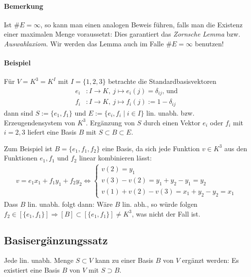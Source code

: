 \paragraph{Bemerkung}
    Ist $\#E = \infty$, so kann man einen analogen Beweis führen, falls man die Existenz einer maximalen Menge voraussetzt: Dies garantiert das \emph{Zornsche Lemma} bzw. \emph{Auswahlaxiom}.
    Wir werden das Lemma auch im Falle $\#E = \infty$ benutzen!

\paragraph{Beispiel}
    Für $V=K^3=K^I$ mit $I=\{1,2,3\}$ betrachte die Standardbasisvektoren 
    \begin{align*}
        e_i &:I\to K,\ j\mapsto e_i(j) = \delta_{ij}\text{, und}\\
        f_i &: I\to K,\ j\mapsto f_i(j):= 1-\delta_{ij}
    \end{align*}
    dann sind $S:= \{e_1,f_1\}$ und $E:= \{e_i,f_i\mid i\in I\}$ lin. unabh. bzw. Erzeugendensystem von $K^3$. Ergänzung von $S$ durch einen Vektor $e_i$ oder $f_i$ mit $i = 2,3$ liefert eine Basis $B$ mit $S\subset B\subset E$.
    
    Zum Beispiel ist $B=\{e_1,f_1,f_2\}$ eine Basis, da sich jede Funktion $v\in K^3$ aus den Funktionen $e_1,f_1$ und $f_2$ linear kombinieren lässt:
    \begin{gather*}
        v=e_1x_1+f_1y_1 + f_2y_2\Leftrightarrow \left\{
            \begin{array}{l}
                v(2)=y_1\\
                v(3) - v(2) = y_1 + y_2 - y_1 = y_2\\
                v(1) + v(2) - v(3) = x_1 + y_2 - y_2 = x_1
            \end{array}
    	\right.
    \end{gather*}
    Dass $B$ lin. unabh. folgt dann: Wäre $B$ lin. abh., so würde folgen $f_2\in [\{e_1,f_1\}]\Rightarrow [B] \subset [\{e_1,f_1\}] \neq K^3$, was nicht der Fall ist.

\subsection{Basisergänzungssatz}
    \begin{Satz}[Basisergänzungssatz]
    	Jede lin. unabh. Menge $S\subset V$ kann zu einer Basis $B$ von $V$ ergänzt werden: Es existiert eine Basis $B$ von $V$ mit $S\supset B$.
    \end{Satz}

